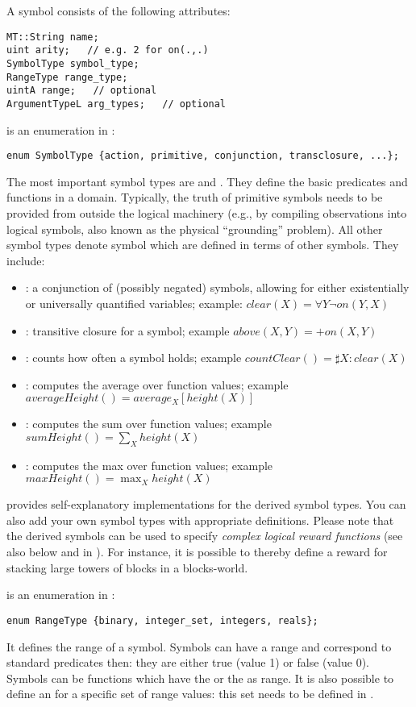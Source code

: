 \documentclass[10pt,twoside,twocolumn,fleqn]{article}
\begin{document}
A symbol consists of the following attributes:
\begin{lstlisting}
MT::String name;
uint arity;   // e.g. 2 for on(.,.)
SymbolType symbol_type;
RangeType range_type;
uintA range;   // optional
ArgumentTypeL arg_types;   // optional
\end{lstlisting}
 is an enumeration in :
\begin{lstlisting}
enum SymbolType {action, primitive, conjunction, transclosure, ...};
\end{lstlisting}
The most important symbol types are  and
. They define the basic predicates and functions in a
domain. Typically, the truth of primitive symbols  needs to be provided
from outside the logical machinery (e.g., by compiling observations into
logical symbols, also known as the physical ``grounding'' problem). All
other symbol types denote symbol which are defined in terms of other
symbols. They include:	
\begin{itemize}
\item {}: a conjunction of (possibly negated)
symbols, allowing for either existentially or universally quantified
variables;
example: $clear(X) = \forall Y \neg on(Y,X)$
\item {}: transitive closure for a symbol;
example
$above(X,Y) = +on(X,Y)$
\item {}: counts how often a symbol holds; example
$countClear() = \sharp X: clear(X)$
\item {}: computes the average over function values;
example $averageHeight() = average_X[height(X)]$
\item {}: computes the sum over function values;
example $sumHeight() = \sum_X height(X)$
\item {}: computes the max over function values;
example $maxHeight() = \max_X height(X)$
\end{itemize}
 provides self-explanatory implementations for the derived
symbol types. You can also add your own symbol types with appropriate
definitions. Please note that the derived symbols can be used to specify
\emph{complex logical reward functions} (see also below and in
). For instance, it is possible to
thereby define a reward for stacking large towers of blocks in a
blocks-world.

 is an enumeration in :
\begin{lstlisting}
enum RangeType {binary, integer_set, integers, reals};
\end{lstlisting}
It defines the range of a symbol. Symbols can have a  range
and correspond to standard predicates then: they are either true (value 1)
or false (value 0). Symbols can be functions which have the 
or the  as range. It is also possible to define an
 for a specific set of range values: this set needs to
be defined in .
\end{document}
